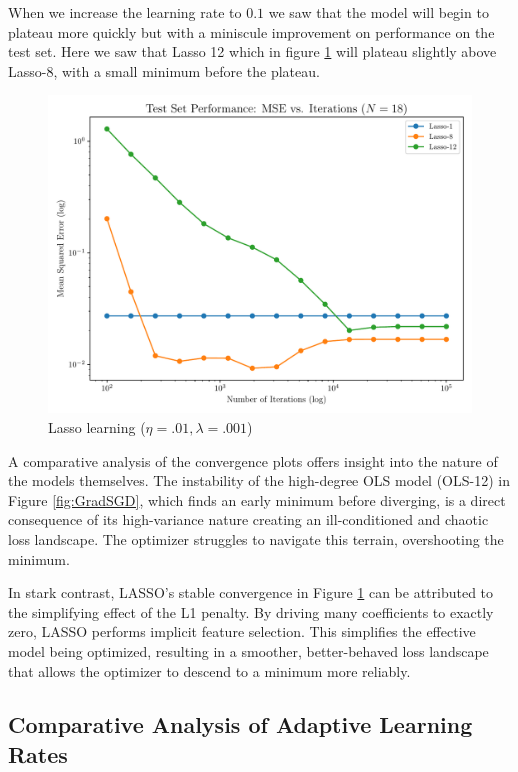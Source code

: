 \documentclass[twocolumn,aps]{revtex4}
\begin{document}
When we increase the learning rate to $0.1$ we saw that the model will begin to plateau more quickly but with a miniscule improvement on performance on the test set. 
Here we saw that Lasso 12 which in figure \ref{fig:Lasso1} will plateau slightly above Lasso-8, with a small minimum before the plateau.


\begin{figure}[h]
    \centering
    \includegraphics[width=.95 \linewidth]{Figures/Lasso_MSE.pdf}
    \caption{Lasso learning ($\eta=.01, \lambda=.001$)}
    \label{fig:Lasso1}
\end{figure}

A comparative analysis of the convergence plots offers insight into the nature of the models themselves. The instability of the high-degree OLS model (OLS-12) in Figure \ref{fig:GradSGD}, which finds an early minimum before diverging, is a direct consequence of its high-variance nature creating an ill-conditioned and chaotic loss landscape. 
The optimizer struggles to navigate this terrain, overshooting the minimum.

In stark contrast, LASSO's stable convergence in Figure \ref{fig:Lasso1} can be attributed to the simplifying effect of the L1 penalty. By driving many coefficients to exactly zero, LASSO performs implicit feature selection. 
This simplifies the effective model being optimized, resulting in a smoother, better-behaved loss landscape that allows the optimizer to descend to a minimum more reliably.

\subsection{Comparative Analysis of Adaptive Learning Rates}
\end{document}
